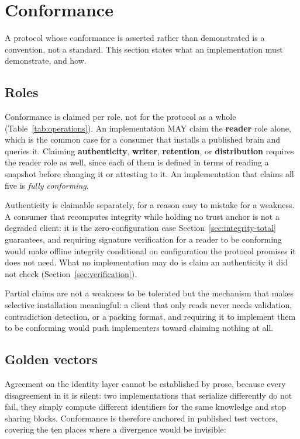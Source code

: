 \documentclass[11pt,a4paper]{article}
\begin{document}
\section{Conformance}
\label{sec:conformance}

A protocol whose conformance is asserted rather than demonstrated is a
convention, not a standard. This section states what an implementation must
demonstrate, and how.

\subsection{Roles}

Conformance is claimed per role, not for the protocol as a whole
(Table~\ref{tab:operations}). An implementation MAY claim the \textbf{reader}
role alone, which is the common case for a consumer that installs a published
brain and queries it. Claiming \textbf{authenticity}, \textbf{writer},
\textbf{retention}, or \textbf{distribution} requires the reader role as well,
since each of them is defined in terms of reading a snapshot before changing it
or attesting to it. An implementation that claims all five is \emph{fully
conforming}.

Authenticity is claimable separately, for a reason easy to mistake for a
weakness. A consumer that recomputes integrity while holding no trust anchor is
not a degraded client: it is the zero-configuration case
Section~\ref{sec:integrity-total} guarantees, and requiring signature
verification for a reader to be conforming would make offline integrity
conditional on configuration the protocol promises it does not need. What no
implementation may do is claim an authenticity it did not check
(Section~\ref{sec:verification}).

Partial claims are not a weakness to be tolerated but the mechanism that makes
selective installation meaningful: a client that only reads never needs
validation, contradiction detection, or a packing format, and requiring it to
implement them to be conforming would push implementers toward
claiming nothing at all.

\subsection{Golden vectors}

Agreement on the identity layer cannot be established by prose, because every
disagreement in it is silent: two implementations that serialize differently do
not fail, they simply compute different identifiers for the same knowledge and
stop sharing blocks. Conformance is therefore anchored in published test vectors, covering the
ten places where a divergence would be invisible:
\end{document}
